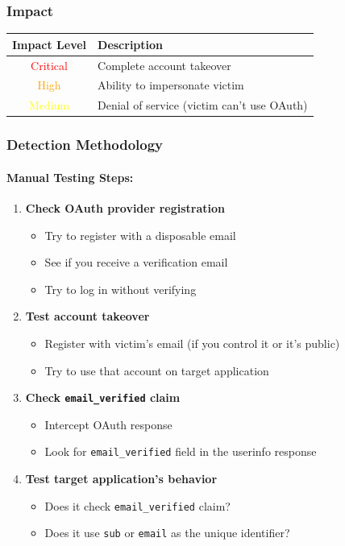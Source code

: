 \documentclass[12pt,a4paper]{article}
\begin{document}
\subsubsection{Impact}
\begin{table}[h]
\centering
\begin{tabular}{|c|l|}
\hline
\textbf{Impact Level} & \textbf{Description} \\
\hline
\textcolor{red}{Critical} & Complete account takeover \\
\textcolor{orange}{High} & Ability to impersonate victim \\
\textcolor{yellow}{Medium} & Denial of service (victim can't use OAuth) \\
\hline
\end{tabular}
\end{table}

\subsubsection{Detection Methodology}
\paragraph{Manual Testing Steps:}
\begin{enumerate}
    \item \textbf{Check OAuth provider registration}
    \begin{itemize}
        \item Try to register with a disposable email
        \item See if you receive a verification email
        \item Try to log in without verifying
    \end{itemize}
    
    \item \textbf{Test account takeover}
    \begin{itemize}
        \item Register with victim's email (if you control it or it's public)
        \item Try to use that account on target application
    \end{itemize}
    
    \item \textbf{Check \texttt{email\_verified} claim}
    \begin{itemize}
        \item Intercept OAuth response
        \item Look for \texttt{email\_verified} field in the userinfo response
    \end{itemize}
    
    \item \textbf{Test target application's behavior}
    \begin{itemize}
        \item Does it check \texttt{email\_verified} claim?
        \item Does it use \texttt{sub} or \texttt{email} as the unique identifier?
    \end{itemize}
\end{enumerate}
\end{document}

